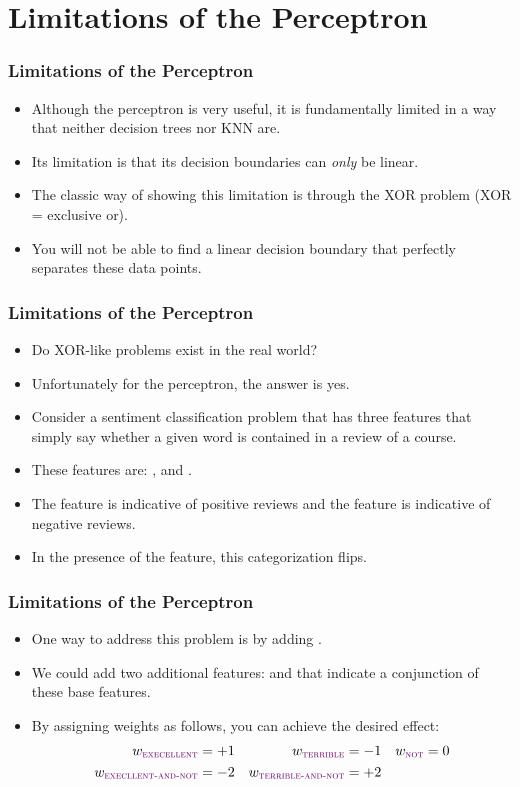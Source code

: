 \documentclass[trans]{beamer}
\begin{document}
\section{Limitations of the Perceptron}
\begin{frame}
  \frametitle{Limitations of the Perceptron}
\begin{itemize}
\item 
Although the perceptron is very useful, it is fundamentally limited in
a way that neither decision trees nor KNN are.  
\item Its limitation is that
its decision boundaries can \emph{only} be linear.  
\item The classic way of
showing this limitation is through the XOR problem (XOR = exclusive
or).  
\end{itemize}
\begin{itemize}
\item You will not be able to find a
linear decision boundary that perfectly separates these data points.
\end{itemize}
\end{frame}

\begin{frame}
  \frametitle{Limitations of the Perceptron}
\begin{itemize}
\item 
Do XOR-like problems exist in the real
world? 
\item Unfortunately for the perceptron, the answer is yes.  
\item Consider
a sentiment classification problem that has three features that simply
say whether a given word is contained in a review of a course. 
\item These
features are: ,  and .  
\item The
 feature is indicative of positive reviews and the
 feature is indicative of negative reviews.  
\item In the
presence of the  feature, this categorization flips.
\end{itemize}
\end{frame}

\begin{frame}
  \frametitle{Limitations of the Perceptron}
\begin{itemize}
\item 
One way to address this problem is by adding .
  \item   We could add two additional features:
 and  that indicate
a conjunction of these base features.  
\item By assigning weights as
follows, you can achieve the desired effect:
\begin{align*}
w_{\feat{execellent}} &= +1
& w_{\feat{terrible}} &= -1
& w_{\feat{not}} &= 0 \\
w_{\feat{execllent-and-not}} &= -2 
& w_{\feat{terrible-and-not}} &= +2
\end{align*}
\end{itemize}
\end{frame}
\end{document}
